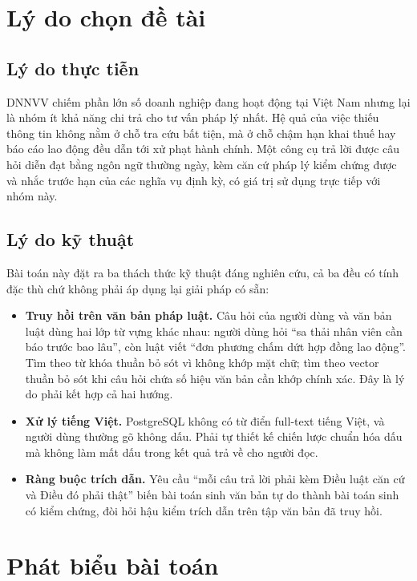 \documentclass[12pt,a4paper]{report}
\numberwithin{equation}{chapter}
\numberwithin{figure}{chapter}
\numberwithin{table}{chapter}
\begin{document}
\section{Lý do chọn đề tài}

\subsection{Lý do thực tiễn}
DNNVV chiếm phần lớn số doanh nghiệp đang hoạt động tại Việt Nam nhưng lại là
nhóm ít khả năng chi trả cho tư vấn pháp lý nhất. Hệ quả của việc thiếu thông tin
không nằm ở chỗ tra cứu bất tiện, mà ở chỗ chậm hạn khai thuế hay báo cáo lao
động đều dẫn tới xử phạt hành chính. Một công cụ trả lời được câu hỏi diễn đạt
bằng ngôn ngữ thường ngày, kèm căn cứ pháp lý kiểm chứng được và nhắc trước hạn
của các nghĩa vụ định kỳ, có giá trị sử dụng trực tiếp với nhóm này.

\subsection{Lý do kỹ thuật}
Bài toán này đặt ra ba thách thức kỹ thuật đáng nghiên cứu, cả ba đều có tính đặc
thù chứ không phải áp dụng lại giải pháp có sẵn:

\begin{itemize}
    \item \textbf{Truy hồi trên văn bản pháp luật.} Câu hỏi của người dùng và văn
    bản luật dùng hai lớp từ vựng khác nhau: người dùng hỏi ``sa thải nhân viên
    cần báo trước bao lâu'', còn luật viết ``đơn phương chấm dứt hợp đồng lao
    động''. Tìm theo từ khóa thuần bỏ sót vì không khớp mặt chữ; tìm theo vector
    thuần bỏ sót khi câu hỏi chứa số hiệu văn bản cần khớp chính xác. Đây là lý
    do phải kết hợp cả hai hướng.
    \item \textbf{Xử lý tiếng Việt.} PostgreSQL không có từ điển full-text tiếng
    Việt, và người dùng thường gõ không dấu. Phải tự thiết kế chiến lược chuẩn
    hóa dấu mà không làm mất dấu trong kết quả trả về cho người đọc.
    \item \textbf{Ràng buộc trích dẫn.} Yêu cầu ``mỗi câu trả lời phải kèm Điều
    luật căn cứ và Điều đó phải thật'' biến bài toán sinh văn bản tự do thành bài
    toán sinh có kiểm chứng, đòi hỏi hậu kiểm trích dẫn trên tập văn bản đã truy
    hồi.
\end{itemize}

\section{Phát biểu bài toán}
\end{document}
